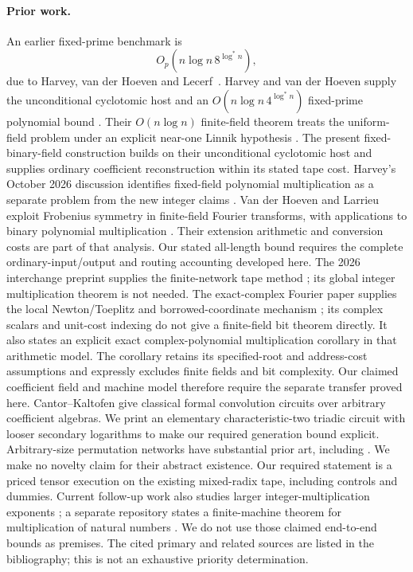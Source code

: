 \documentclass[11pt]{article}
\begin{document}
\paragraph{Prior work.}
An earlier fixed-prime benchmark is
\[
 O_p(n\log n\,8^{\log^* n}),
\]
due to Harvey, van der Hoeven and Lecerf~\cite{HVHL17}.
Harvey and van der Hoeven supply the unconditional cyclotomic host and
an $O(n\log n\,4^{\log^*n})$ fixed-prime polynomial bound
\cite{cyclomult}. Their $O(n\log n)$ finite-field theorem treats the uniform-field
problem under an explicit near-one Linnik hypothesis \cite{ffnlogn}.
The present fixed-binary-field construction builds on their
unconditional cyclotomic host and supplies ordinary coefficient
reconstruction within its stated tape cost.
Harvey's October 2026 discussion identifies fixed-field polynomial
multiplication as a separate problem from the new integer claims
\cite[Section 4]{Harvey26Context}.
Van der Hoeven and Larrieu exploit Frobenius symmetry in finite-field
Fourier transforms, with applications to binary polynomial multiplication
\cite{Frobenius17}. Their extension arithmetic and conversion costs
are part of that analysis. Our stated all-length bound requires the
complete ordinary-input/output and routing accounting developed here.
The 2026 interchange preprint supplies the finite-network tape method
\cite{swap}; its global integer multiplication theorem is not needed.
The exact-complex Fourier paper supplies the local Newton/Toeplitz and
borrowed-coordinate mechanism \cite{local}; its complex scalars and
unit-cost indexing do not give a finite-field bit theorem directly.
It also states an explicit exact complex-polynomial multiplication
corollary in that arithmetic model. The corollary retains its
specified-root and address-cost assumptions and expressly excludes
finite fields and bit complexity. Our claimed coefficient field and
machine model therefore require the separate transfer proved here.
Cantor--Kaltofen \cite{cantor-kaltofen} give classical formal
convolution circuits over arbitrary coefficient algebras. We print
an elementary characteristic-two triadic circuit with looser
secondary logarithms to make our required generation bound explicit.
Arbitrary-size permutation networks have substantial prior art,
including \cite{benes}. We make no novelty claim for their abstract
existence. Our required statement is a priced tensor execution on
the existing mixed-radix tape, including controls and dummies.
Current follow-up work also studies larger integer-multiplication
exponents \cite{integer-followups}; a separate repository states a
finite-machine theorem for multiplication of natural numbers
\cite{integer-lean}. We do not use those claimed end-to-end bounds
as premises. The cited primary and related sources are listed in the
bibliography; this is not an exhaustive priority determination.
\end{document}
